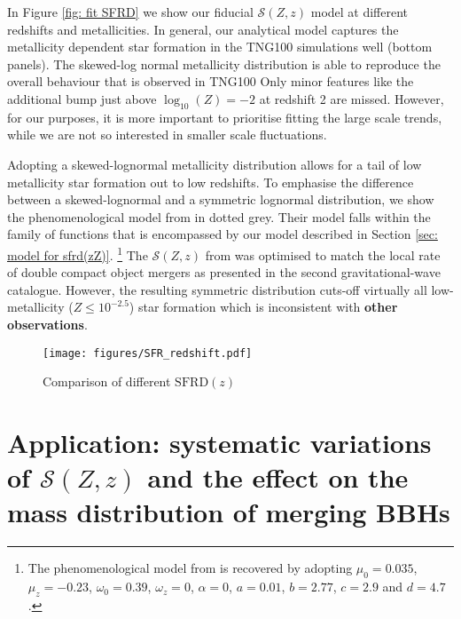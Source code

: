 \documentclass[twocolumn]{aastex631}
\newcommand{\SFRDzZ}{\ensuremath{\mathcal{S}(Z,z)}\xspace}
\newcommand{\SFRDz}{\ensuremath{\mathrm{SFRD}(z)}\xspace}
\newcommand{\todo}[1]{{\color{purple}\bf{#1}}}
\begin{document}
In Figure \ref{fig: fit SFRD} we show our fiducial \SFRDzZ model at different redshifts and metallicities.
In general, our analytical model captures the metallicity dependent star formation in the TNG100 simulations well (bottom panels). 
The skewed-log normal metallicity distribution is able to reproduce the overall behaviour that is observed in TNG100 \citep[bottom left panel, but cf. ][for an in-depth discussion of low metallicity star formation in the TNG50 simulation]{Pakmor+2022}
Only minor features like the additional bump just above $\log_{10}(Z) = -2$ at redshift 2 are missed. 
However, for our purposes, it is more important to prioritise fitting the large scale trends, while we are not so interested in smaller scale fluctuations.

Adopting a skewed-lognormal metallicity distribution allows for a tail of low metallicity star formation out to low redshifts. To emphasise the difference between a skewed-lognormal and a symmetric lognormal distribution, we show the phenomenological model from \cite{Neijssel+2019} in dotted grey. Their model falls within the family of functions that is encompassed by our model described in Section \ref{sec: model for sfrd(zZ)}. \footnote{The phenomenological model from \cite{Neijssel+2019} is recovered by adopting $\mu_0= 0.035$, $\mu_z=-0.23$, $\omega_0=0.39 $, $\omega_z = 0$, $\alpha = 0$, $a=0.01$, $b=2.77$, $c=2.9$ and $d=4.7$. }
The \SFRDzZ from \cite{Neijssel+2019} was optimised to match the local rate of double compact object mergers as presented in the second gravitational-wave catalogue. However, the resulting symmetric distribution cuts-off virtually all low-metallicity ($Z\leq 10^{-2.5}$) star formation which is inconsistent with \todo{other observations}.


\begin{figure}
\centering
{}
\texttt{[image: figures/SFR\_redshift.pdf]}
\caption{Comparison of different \SFRDz
 \label{fig: SFR(z)}}
\end{figure}








\section{Application: systematic variations of \SFRDzZ and the effect on the mass distribution of merging BBHs \label{sec: mass dists}}
\end{document}
